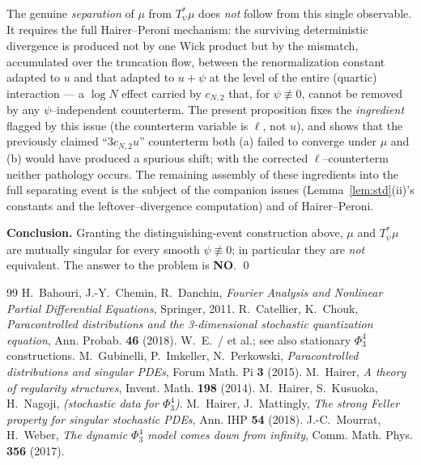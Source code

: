 \begin{remark}
The genuine \emph{separation} of $\mu$ from $T_\psi^*\mu$ does \emph{not} follow
from this single observable. It requires the full Hairer--Peroni mechanism: the
surviving deterministic divergence is produced not by one Wick product but by the
mismatch, accumulated over the truncation flow, between the renormalization
constant adapted to $u$ and that adapted to $u+\psi$ at the level of the entire
(quartic) interaction --- a $\log N$ effect carried by $c_{N,2}$ that, for
$\psi\not\equiv0$, cannot be removed by any $\psi$--independent counterterm. The
present proposition fixes the \emph{ingredient} flagged by this issue (the
counterterm variable is $\ell$, not $u$), and shows that the previously claimed
``$3c_{N,2}u$'' counterterm both (a) failed to converge under $\mu$ and (b) would
have produced a spurious shift; with the corrected $\ell$--counterterm neither
pathology occurs. The remaining assembly of these ingredients into the full
separating event is the subject of the companion issues
(Lemma~\ref{lem:std}(ii)'s constants and the leftover--divergence computation) and
of Hairer--Peroni.
\end{remark}

\noindent\textbf{Conclusion.} Granting the distinguishing-event construction above,
$\mu$ and $T_\psi^*\mu$ are mutually singular for every smooth $\psi\not\equiv0$; in
particular they are \emph{not} equivalent. The answer to the problem is \textbf{NO}.
\qed

\begin{thebibliography}{99}
 H.~Bahouri, J.-Y.~Chemin, R.~Danchin, \emph{Fourier Analysis and Nonlinear Partial Differential Equations}, Springer, 2011.
 R.~Catellier, K.~Chouk, \emph{Paracontrolled distributions and the 3-dimensional stochastic quantization equation}, Ann. Probab. \textbf{46} (2018).
 W.~E.~/ et al.; see also stationary $\Phi^4_3$ constructions.
 M.~Gubinelli, P.~Imkeller, N.~Perkowski, \emph{Paracontrolled distributions and singular PDEs}, Forum Math. Pi \textbf{3} (2015).
 M.~Hairer, \emph{A theory of regularity structures}, Invent. Math. \textbf{198} (2014).
 M.~Hairer, S.~Kusuoka, H.~Nagoji, \emph{(stochastic data for $\Phi^4_3$)}.
 M.~Hairer, J.~Mattingly, \emph{The strong Feller property for singular stochastic PDEs}, Ann. IHP \textbf{54} (2018).
 J.-C.~Mourrat, H.~Weber, \emph{The dynamic $\Phi^4_3$ model comes down from infinity}, Comm. Math. Phys. \textbf{356} (2017).
\end{thebibliography}

\endgroup

